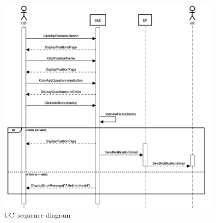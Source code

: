 \begin{figure}
    \centering
    \includegraphics[width=16cm]{images/sequence-diagrams/company-adds-questionnaire.png}
    \caption{UC\theuc\ sequence diagram}
\end{figure}


